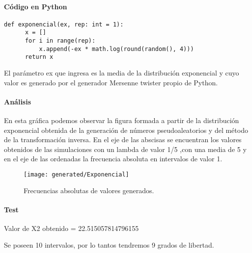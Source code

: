\documentclass{article}
\begin{document}
  \paragraph{Código en Python}
  \begin{lstlisting}[style = Python]
    def exponencial(ex, rep: int = 1):
      x = []
      for i in range(rep):
          x.append(-ex * math.log(round(random(), 4)))
      return x

  \end{lstlisting}
  El parámetro ex que ingresa es la media de la distribución exponencial y cuyo valor es generado por el generador Mersenne twister propio de Python.

  \paragraph{Análisis\newline}

  En esta gráfica podemos observar la figura formada a partir de la distribución exponencial obtenida de la generación de números pseudoaleatorios y del método de la transformación inversa.
  En el eje de las abscisas se encuentran los valores obtenidos de las simulaciones con un lambda de valor 1/5 ,con una media de 5 y en el eje
  de las ordenadas la frecuencia absoluta en intervalos de valor 1.

  \begin{figure}[h]
    \centering
    \texttt{[image: generated/Exponencial]}
    \caption{Frecuencias absolutas de valores generados.}
  \end{figure}
  \newpage
  \paragraph{Test\newline}

  Valor de X2 obtenido = 22.515057814796155

  Se poseen 10 intervalos, por lo tantos tendremos 9 grados de libertad.
\end{document}
